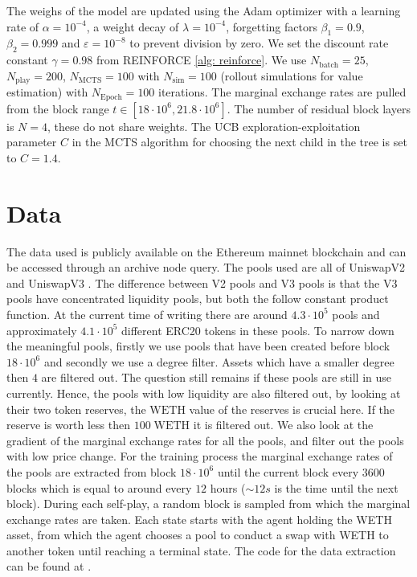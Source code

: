 The weighs of the model are updated using the Adam optimizer \cite{adam} with
a learning rate of $\alpha = 10^{-4} $, a weight decay of $\lambda =
10^{-4}$, forgetting factors $\beta_1 = 0.9$, $\beta_2 = 0.999$ and
$\varepsilon = 10^{-8}$ to prevent division by zero. We set the discount rate
constant $\gamma = 0.98$ from REINFORCE \ref{alg: reinforce}. We use
$N_{\text{batch} } = 25$, $N_{\text{play}} = 200$, $N_{\text{MCTS}} = 100$
with $N_{\text{sim}}=100$ (rollout simulations for value estimation) with
$N_{\text{Epoch}}=100$ iterations. The marginal exchange rates are pulled from the block range
$t \in [18\cdot10^{6}, 21.8\cdot10^6]$. The number of residual block layers
is $N=4$, these do not share weights. The UCB exploration-exploitation
parameter $C$ in the MCTS algorithm for choosing the next child in the tree
is set to $C=1.4$.
\section{Data}
The data used is publicly available on the Ethereum mainnet blockchain and
can be accessed through an archive node query. The pools used are all of
UniswapV2 \cite{uniswap} and UniswapV3 \cite{uniswapv3_paper}. The difference
between V2 pools and V3 pools is that the V3 pools have concentrated
liquidity pools, but both the follow constant product function. At the
current time of writing there are around $4.3\cdot10^{5}$ pools and
approximately $4.1\cdot10^{5}$ different ERC20 \cite{erc20} tokens in these
pools. To narrow down the meaningful pools, firstly we use pools that have
been created before block $18\cdot10^{6}$ and secondly we use a degree
filter. Assets which have a smaller degree then $4$ are filtered out. The
question still remains if these pools are still in use currently. Hence, the
pools with low liquidity are also filtered out, by looking at their two token
reserves, the $\text{WETH}$ value of the reserves is crucial here. If the
reserve is worth less then $100\; \text{WETH} $ it is filtered out. We also
look at the gradient of the marginal exchange rates for all the pools, and
filter out the pools with low price change. For the training process the
marginal exchange rates of the pools are extracted from block $18\cdot10^{6}$
until the current block every $3600$ blocks which is equal to around every
$12$ hours ($\sim12s$ is the time until the next block). During each
self-play, a random block is sampled from which the marginal exchange rates
are taken. Each state starts with the agent holding the WETH asset, from
which the agent chooses a pool to conduct a swap with WETH to another token
until reaching a terminal state. The code for the data extraction can be
found at \cite[Github]{github}.

